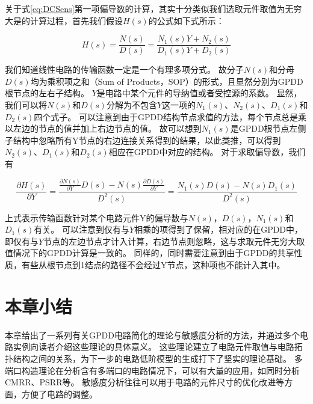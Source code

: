 关于式\ref{eq:DCSens}第一项偏导数的计算，其实十分类似我们选取元件取值为无穷大是的计算过程，首先我们假设$H\left(s\right)$的公式如下式所示：

\begin{equation}
H\left( s \right) = \frac{{N\left( s \right)}}{{D\left( s \right)}} = \frac{{{N_1}\left( s \right)Y + {N_2}\left( s \right)}}{{{D_1}\left( s \right)Y + {D_2}\left( s \right)}}
\end{equation}

我们知道线性电路的传输函数一定是一个有理多项分式。
故分子$N\left(s\right)$和分母$D\left(s\right)$均为乘积项之和（Sum of Products，SOP）的形式，且显然分别为GPDD根节点的左右子结构。
$Y$是电路中某个元件的导纳值或者受控源的系数。
显然，我们可以将$N\left(s\right)$和$D\left(s\right)$分解为不包含$Y$这一项的$N_1\left(s\right)$、$N_2\left(s\right)$、$D_1\left(s\right)$和$D_2\left(s\right)$四个式子。
可以注意到由于GPDD结构节点求值的方法，每个节点总是乘以左边的节点的值并加上右边节点的值。
故可以想到$N_1\left(s\right)$是GPDD根节点左侧子结构中忽略所有Y节点的右边连接关系得到的结果，以此类推，可以得到$N_2\left(s\right)$、$D_1\left(s\right)$和$D_2\left(s\right)$相应在GPDD中对应的结构。
对于求取偏导数，我们有

\begin{equation}
\frac{{\partial H\left( s \right)}}
{{\partial Y}} = \frac{{\frac{{\partial N\left( s \right)}}
		{{\partial Y}}D\left( s \right) - N\left( s \right)\frac{{\partial D\left( s \right)}}
		{{\partial Y}}}}
{{{D^2}\left( s \right)}} = \frac{{{N_1}\left( s \right)D\left( s \right) - N\left( s \right){D_1}\left( s \right)}}
{{{D^2}\left( s \right)}}
\end{equation}

上式表示传输函数针对某个电路元件Y的偏导数与$N\left(s\right)$，$D\left(s\right)$，$N_1\left(s\right)$和$D_1\left(s\right)$有关。
可以注意到仅有与$Y$相乘的项得到了保留，相对应的在GPDD中，即仅有与$Y$节点的左边节点才计入计算，右边节点则忽略，这与求取元件无穷大取值情况下的GPDD计算是一致的。
同样的，同时需要注意到由于GPDD的共享性质，有些从根节点到1结点的路径不会经过Y节点，这种项也不能计入其中。

\section{本章小结}

本章给出了一系列有关GPDD电路简化的理论与敏感度分析的方法，并通过多个电路实例向读者介绍这些理论的具体意义。
这些理论建立了电路元件取值与电路拓扑结构之间的关系，为下一步的电路低阶模型的生成打下了坚实的理论基础。
多端口构造理论在分析含有多端口的电路情况下，可以有大量的应用，如同时分析CMRR、PSRR等。
敏感度分析往往可以用于电路的元件尺寸的优化改进等方面，方便了电路的调整。